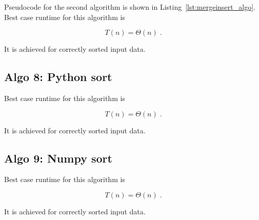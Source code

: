Pseudocode for the second algorithm is shown in
Listing~\ref{lst:mergeinsert_algo}. Best case runtime for this algorithm
is

\begin{equation}
  T(n) = \Theta(n) \;.  \label{eq:ins_sort_best}
\end{equation}

It is achieved for correctly sorted input data.

\subsection{Algo 8: Python sort}\label{sec:algo8}

Best case runtime for this algorithm is

\begin{equation}
  T(n) = \Theta(n) \;.  \label{eq:ins_sort_best}
\end{equation}

It is achieved for correctly sorted input data.

\subsection{Algo 9: Numpy sort}\label{sec:algo9}

Best case runtime for this algorithm is

\begin{equation}
  T(n) = \Theta(n) \;.  \label{eq:ins_sort_best}
\end{equation}

It is achieved for correctly sorted input data.
